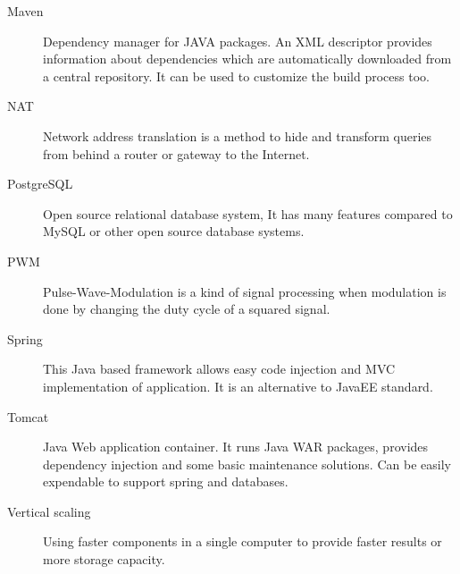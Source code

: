 \begin{description}
	\item[Maven] Dependency manager for JAVA packages. An XML descriptor provides information about dependencies which are automatically downloaded from a central repository. It can be used to customize the build process too.
	
	\item[NAT] Network address translation is a method to hide and transform queries from behind a router or gateway to the Internet.
	
	\item[PostgreSQL] Open source relational database system, It has many features compared to MySQL or other open source database systems.
	
	\item[PWM] Pulse-Wave-Modulation is a kind of signal processing when modulation is done by changing the duty cycle of a squared signal.
	
	\item[Spring] This Java based framework allows easy code injection and MVC implementation of application. It is an alternative to JavaEE standard.

	\item[Tomcat]  Java Web application container. It runs Java WAR packages, provides dependency injection and some basic maintenance solutions. Can be easily expendable to support spring and databases.

	\item[Vertical scaling] Using faster components in a single computer to provide faster results or more storage capacity.
\end{description}
